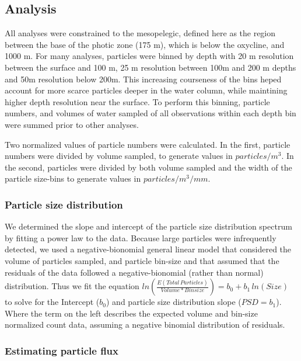 \documentclass[]{article}
\begin{document}
\hypertarget{analysis}{%
\subsection{Analysis}\label{analysis}}

All analyses were constrained to the mesopelegic, defined here as the
region between the base of the photic zone (175 m), which is below the
oxycline, and 1000 m. For many analyses, particles were binned by depth
with 20 m resolution between the surface and 100 m, 25 m resolution
between 100m and 200 m depths and 50m resolution below 200m. This
increasing courseness of the bins heped account for more scarce
particles deeper in the water column, while maintining higher depth
resolution near the surface. To perform this binning, particle numbers,
and volumes of water sampled of all observations within each depth bin
were summed prior to other analyses.

Two normalized values of particle numbers were calculated. In the first,
particle numbers were divided by volume sampled, to generate values in
\(particles/m^3\). In the second, particles were divided by both volume
sampled and the width of the particle size-bins to generate values in
\(particles/m^3/mm\).

\hypertarget{particle-size-distribution}{%
\subsubsection{Particle size
distribution}\label{particle-size-distribution}}

We determined the slope and intercept of the particle size distribution
spectrum by fitting a power law to the data. Because large particles
were infrequently detected, we used a negative-bionomial general linear
model that considered the volume of particles sampled, and particle
bin-size and that assumed that the residuals of the data followed a
negative-bionomial (rather than normal) distribution. Thus we fit the
equation
\(ln(\frac{E(Total\,Particles)}{Volume *Binsize}) = b_0 + b_1\,ln(Size)\)
to solve for the Intercept (\(b_0\)) and particle size distribution
slope (\(PSD = b_1\)). Where the term on the left describes the expected
volume and bin-size normalized count data, assuming a negative binomial
distribution of residuals.

\hypertarget{estimating-particle-flux}{%
\subsubsection{Estimating particle
flux}\label{estimating-particle-flux}}
\end{document}
